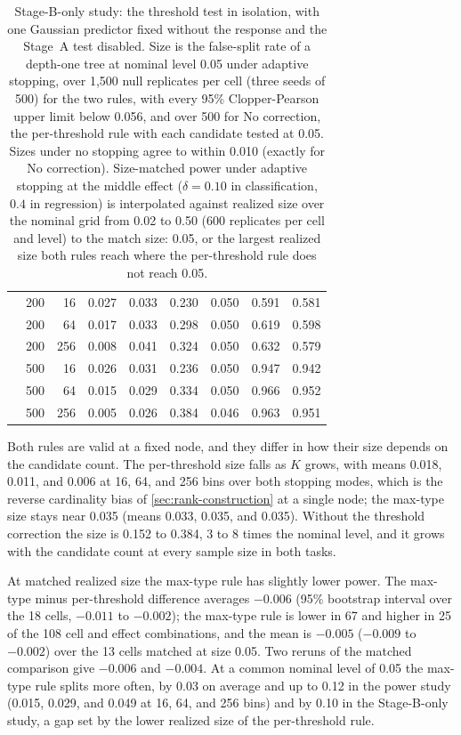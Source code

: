 \begin{table}[tb]
\begin{tabular}{@{}lrrrrrrrr@{}}
     & 200 & 16 & 0.027 & 0.033 & 0.230 & 0.050 & 0.591 & 0.581 \\
     & 200 & 64 & 0.017 & 0.033 & 0.298 & 0.050 & 0.619 & 0.598 \\
     & 200 & 256 & 0.008 & 0.041 & 0.324 & 0.050 & 0.632 & 0.579 \\
     & 500 & 16 & 0.026 & 0.031 & 0.236 & 0.050 & 0.947 & 0.942 \\
     & 500 & 64 & 0.015 & 0.029 & 0.334 & 0.050 & 0.966 & 0.952 \\
     & 500 & 256 & 0.005 & 0.026 & 0.384 & 0.046 & 0.963 & 0.951 \\
    \bottomrule
  \end{tabular}
  \caption{Stage-B-only study: the threshold test in isolation, with one
  Gaussian predictor fixed without the response and the Stage~A test disabled.
  Size is the false-split rate of a depth-one tree at nominal level 0.05 under
  adaptive stopping, over 1,500 null replicates per cell (three seeds of 500)
  for the two rules, with every 95\% Clopper-Pearson upper limit below 0.056,
  and over 500 for No correction, the per-threshold rule with each candidate
  tested at 0.05. Sizes under no stopping agree to within 0.010 (exactly for
  No correction). Size-matched power under adaptive stopping at the middle effect ($\delta = 0.10$ in
  classification, $0.4$ in regression) is interpolated against realized size
  over the nominal grid from 0.02 to 0.50 (600 replicates per cell and level)
  to the match size: 0.05, or the largest realized size both rules reach where
  the per-threshold rule does not reach 0.05.}
  \label{tab:stageB-only}
\end{table}

Both rules are valid at a fixed node, and they differ in how their size
depends on the candidate count. The per-threshold size falls as $K$ grows, with
means 0.018, 0.011, and 0.006 at 16, 64, and 256 bins over both stopping modes,
which is the reverse cardinality bias of \cref{sec:rank-construction} at a
single node; the max-type size stays near 0.035 (means 0.033, 0.035, and
0.035). Without the threshold correction the size is 0.152 to 0.384, 3 to 8
times the nominal level, and it grows with the candidate count at every sample
size in both tasks.

At matched realized size the max-type rule has slightly lower power. The
max-type minus per-threshold difference averages $-0.006$ (95\% bootstrap
interval over the 18 cells, $-0.011$ to $-0.002$); the max-type rule is lower
in 67 and higher in 25 of the 108 cell and effect combinations, and the mean is
$-0.005$ ($-0.009$ to $-0.002$) over the 13 cells matched at size 0.05. Two reruns of the matched comparison
give $-0.006$ and $-0.004$. At a common nominal level of 0.05 the max-type rule
splits more often, by 0.03 on
average and up to 0.12 in the power study (0.015, 0.029, and 0.049 at 16, 64,
and 256 bins) and by 0.10 in the Stage-B-only study, a gap set by the lower
realized size of the per-threshold rule.


